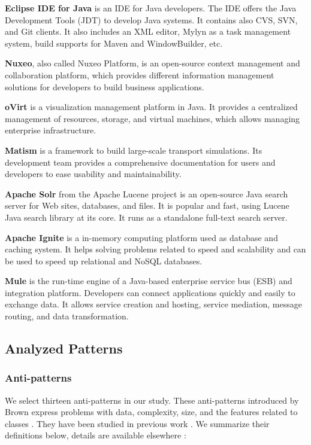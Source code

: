 \noindent\textbf{Eclipse IDE for Java} is an IDE for Java developers. The IDE offers the Java Development Tools (JDT) to develop Java systems. It contains also CVS, SVN, and Git clients. It also includes an XML editor, Mylyn as a task management system, build supports for Maven and WindowBuilder, etc.

\noindent\textbf{Nuxeo}, also called Nuxeo Platform, is an open-source context management and collaboration platform, which provides different information management solutions for developers to build business applications.

\noindent\textbf{oVirt} is a visualization management platform in Java. It provides a centralized management of resources, storage, and virtual machines, which allows managing enterprise infrastructure.

\noindent\textbf{Matism} is a framework to build large-scale transport simulations. Its development team provides a comprehensive documentation for users and developers to ease usability and maintainability. 

\noindent\textbf{Apache Solr} from the Apache Lucene project is an open-source Java search server for Web sites, databases, and files. It is popular and fast, using Lucene Java search library at its core. It runs as a standalone full-text search server. 

\noindent\textbf{Apache Ignite} is a in-memory computing platform used as database and caching system. It helps solving problems related to speed and scalability and can be used to speed up relational and NoSQL databases.

\noindent\textbf{Mule} is the run-time engine of a Java-based enterprise service bus (ESB) and integration platform. Developers can connect applications quickly and easily to exchange data. It allows service creation and hosting, service mediation, message routing, and data transformation.



\subsection{Analyzed Patterns}

\subsubsection{Anti-patterns}

We select thirteen anti-patterns in our study. These anti-patterns introduced by Brown \etal \cite{brown1998antipatterns} express problems with data, complexity, size, and the features related to classes \cite{khomh2012exploratory}. They have been studied in previous work \cite{khomh2012exploratory}. We summarize their definitions below, details are available elsewhere \cite{romano2012analyzing}:

